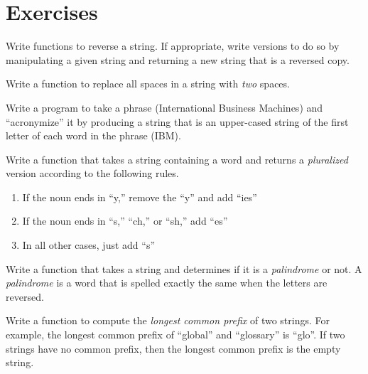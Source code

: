 

\section{Exercises}

\begin{exer}
Write functions to reverse a string.  If appropriate, write versions to do so by manipulating a given
string and returning a new string that is a reversed copy.
\end{exer}

\begin{exer}
Write a function to replace all spaces in a string with \emph{two} spaces.
\end{exer}

\begin{exer}
Write a program to take a phrase (International Business Machines) and ``acronymize'' it by producing
a string that is an upper-cased string of the first letter of each word in the phrase (IBM).
\end{exer}

\begin{exer}
Write a function that takes a string containing a word and returns a \emph{pluralized} version
according to the following rules.
\begin{enumerate}
  \item If the noun ends in ``y,'' remove the ``y'' and add ``ies''
  \item If the noun ends in ``s,'' ``ch,'' or ``sh,'' add ``es''
  \item In all other cases, just add ``s''
\end{enumerate}
\end{exer}

\begin{exer}
Write a function that takes a string and determines if it is a \emph{palindrome}
or not.  A \emph{palindrome} is a word that is spelled exactly the same when 
the letters are reversed.  
\end{exer}

\begin{exer}
Write a function to compute the \emph{longest common prefix}
of two strings.  For example, the longest common prefix of ``global''
and ``glossary'' is ``glo''.  If two strings have no common prefix, 
then the longest common prefix is the empty string. 
\end{exer}

